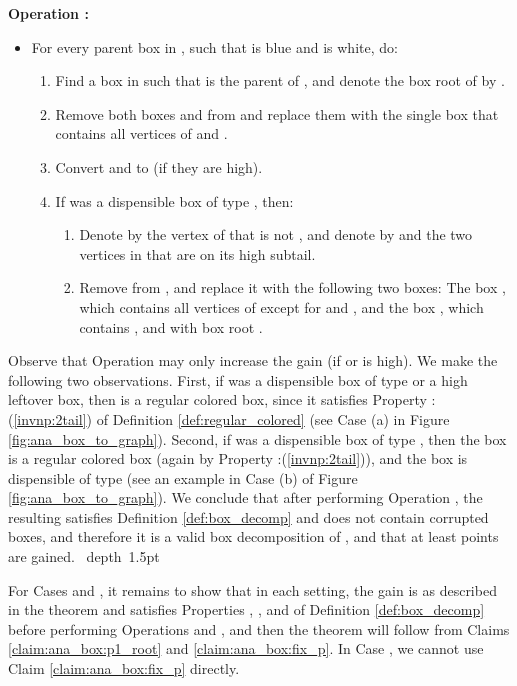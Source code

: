\documentclass[11pt]{article}
\def\blackslug{\hbox{\hskip 1pt \vrule width 4pt height 8pt
    depth 1.5pt \hskip 1pt}}
\def\QED{\quad\blackslug\lower 8.5pt\null\par}
\def\dnsitem{\vspace{-7pt}\item}
\def\dnssubitem{\vspace{-5pt}\item}
\theoremstyle{definition}
\begin{document}
\smallskip
\par\noindent
{\bf Operation :}
\begin{itemize}
\dnsitem[] For every parent box  in , such that  is blue and  is white, do:
	\begin{enumerate}
		\dnsitem Find a box  in  such that  is the parent of , and denote the box root of  by .
		\dnsitem Remove both boxes  and  from  and replace them with the single box  that contains all vertices of  and .
		\dnsitem Convert  and  to  (if they are high).
		\dnsitem If  was a dispensible box of type , then:
		\begin{enumerate}
			\dnsitem Denote by  the  vertex of  that is not , and denote by  and  the two vertices in  that are on its high subtail.
			\dnssubitem Remove  from , and replace it with the following two boxes:
			The box , which contains all vertices of  except for  and , 
			and the box , which contains ,  and  with box root . 
		\end{enumerate}
	\end{enumerate}
\end{itemize}
\bigskip

Observe that Operation  may only increase the gain (if  or  is high).
We make the following two observations.
First, if  was a dispensible box of type  or a high leftover box, then  is a regular colored box, since it satisfies Property :(\ref{invnp:2tail}) of Definition \ref{def:regular_colored}
(see Case (a) in Figure \ref{fig:ana_box_to_graph}).
Second, if  was a dispensible box of type , then the box  is a regular colored box (again by Property :(\ref{invnp:2tail})), and the box  is dispensible of type  (see an example in Case (b) of Figure \ref{fig:ana_box_to_graph}).
We conclude that after performing Operation , the resulting  satisfies Definition \ref{def:box_decomp} and does not contain corrupted boxes, and therefore it is a valid box decomposition of , and that at least  points are gained.
\QED


For Cases  and , it remains to show that in each setting, the gain is as described in the theorem and  satisfies Properties , ,  and  of Definition \ref{def:box_decomp} before performing Operations  and , and then the theorem will follow from Claims \ref{claim:ana_box:p1_root} and \ref{claim:ana_box:fix_p}.
In Case , we cannot use Claim \ref{claim:ana_box:fix_p} directly.
\end{document}

